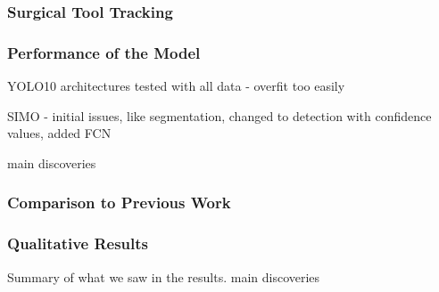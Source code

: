 \subsubsection{Surgical Tool Tracking}



\subsubsection{Performance of the Model}

YOLO10 architectures
tested with all data - overfit too easily

SIMO - initial issues, like segmentation, changed to detection with confidence values, added FCN

main discoveries

\subsubsection{Comparison to Previous Work}

\subsubsection{Qualitative Results}

Summary of what we saw in the results. main discoveries